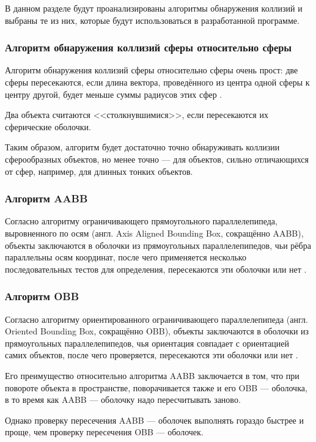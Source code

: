В данном разделе будут проанализированы алгоритмы обнаружения коллизий и выбраны те из них, которые будут использоваться в разработанной программе.

\subsubsection{Алгоритм обнаружения коллизий сферы относительно сферы}

Алгоритм обнаружения коллизий сферы относительно сферы очень прост: две сферы пересекаются, если длина вектора, проведённого из центра одной сферы к центру другой, будет меньше суммы радиусов этих сфер \cite{gea}. %

Два объекта считаются <<столкнувшимися>>, если пересекаются их сферические оболочки.

Таким образом, алгоритм будет достаточно точно обнаруживать коллизии сферообразных объектов, но менее точно --- для объектов, сильно отличающихся от сфер, например, для длинных тонких объектов.

\subsubsection{Алгоритм AABB}

Согласно алгоритму ограничивающего прямоугольного параллелепипеда, выровненного по осям (англ. Axis Aligned Bounding Box, сокращённо AABB), объекты заключаются в оболочки из прямоугольных параллелепипедов, чьи рёбра параллельны осям координат, после чего применяется несколько последовательных тестов для определения, пересекаются эти оболочки или нет \cite{gea}. %

\subsubsection{Алгоритм OBB}

Согласно алгоритму ориентированного ограничивающего параллелепипеда (англ. Oriented Bounding Box, сокращённо OBB), объекты заключаются в оболочки из прямоугольных параллелепипедов, чья ориентация совпадает с ориентацией самих объектов, после чего проверяется, пересекаются эти оболочки или нет \cite{gea}. %

Его преимущество относительно алгоритма AABB заключается в том, что при повороте объекта в пространстве, поворачивается также и его OBB --- оболочка, в то время как AABB --- оболочку надо пересчитывать заново.

Однако проверку пересечения AABB --- оболочек выполнять гораздо быстрее и проще, чем проверку пересечения OBB --- оболочек.

